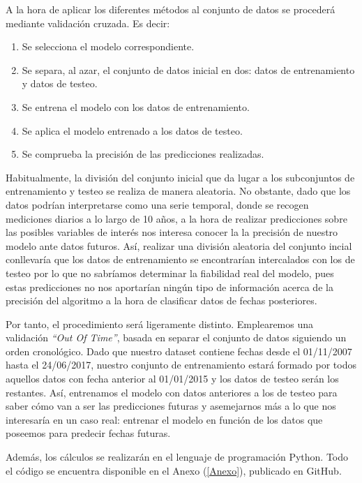 \documentclass[12pt,twoside]{article}
\begin{document}
A la hora de aplicar los diferentes métodos al conjunto de datos se procederá mediante validación cruzada. Es decir:

\begin{enumerate}
\item Se selecciona el modelo correspondiente.
\item Se separa, al azar, el conjunto de datos inicial en dos: datos de entrenamiento y datos de testeo.
\item Se entrena el modelo con los datos de entrenamiento.
\item Se aplica el modelo entrenado a los datos de testeo.
\item Se comprueba la precisión de las predicciones realizadas.
\end{enumerate}

Habitualmente, la división del conjunto inicial que da lugar a los subconjuntos de entrenamiento y testeo se realiza de manera aleatoria. No obstante, dado que los datos podrían interpretarse como una serie temporal, donde se recogen mediciones diarios a lo largo de 10 años, a la hora de realizar predicciones sobre las posibles variables de interés nos interesa conocer la la precisión de nuestro modelo ante datos futuros.  Así, realizar una división aleatoria del conjunto incial conllevaría que los datos de entrenamiento se encontrarían intercalados con los de testeo por lo que no sabríamos determinar la fiabilidad real del modelo, pues estas predicciones no nos aportarían ningún tipo de información acerca de la precisión del algoritmo a la hora de clasificar datos de fechas posteriores.

Por tanto, el procedimiento será ligeramente distinto. Emplearemos una validación \textit{``Out Of Time''}, basada en separar el conjunto de datos siguiendo un orden cronológico. Dado que nuestro dataset contiene fechas desde el 01/11/2007 hasta el 24/06/2017, nuestro conjunto de entrenamiento estará formado por todos aquellos datos con fecha anterior al 01/01/2015 y los datos de testeo serán los restantes. Así, entrenamos el modelo con datos anteriores a los de testeo para saber cómo van a ser las predicciones futuras y asemejarnos más a lo que nos interesaría en un caso real: entrenar el modelo en función de los datos que poseemos para predecir fechas futuras.

Además, los cálculos se realizarán en el lenguaje de programación Python. Todo el código se encuentra disponible en el Anexo (\ref{Anexo}), publicado en GitHub.
\end{document}
